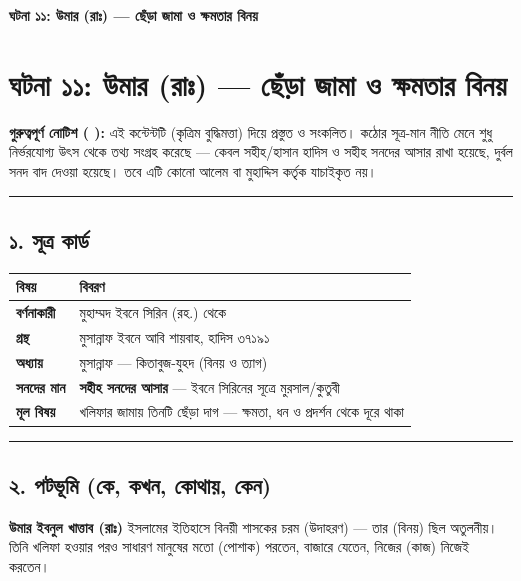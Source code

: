 

\begin{center}{\Large\bfseries\color{emerald} ঘটনা ১১: উমার (রাঃ) — ছেঁড়া জামা ও ক্ষমতার বিনয়}\end{center}
\vspace{1em}
\section*{ঘটনা ১১: উমার (রাঃ) — ছেঁড়া জামা ও ক্ষমতার বিনয়}

\begin{warnbox}
 \textbf{গুরুত্বপূর্ণ নোটিশ ( ):} এই কন্টেন্টটি  (কৃত্রিম বুদ্ধিমত্তা) দিয়ে প্রস্তুত ও সংকলিত।  কঠোর সূত্র-মান নীতি মেনে শুধু নির্ভরযোগ্য উৎস থেকে তথ্য সংগ্রহ করেছে — কেবল সহীহ/হাসান হাদিস ও সহীহ সনদের আসার রাখা হয়েছে, দুর্বল সনদ বাদ দেওয়া হয়েছে। তবে এটি কোনো আলেম বা মুহাদ্দিস কর্তৃক যাচাইকৃত নয়।
\end{warnbox}


\medskip\hrule\medskip

\subsection*{১. সূত্র কার্ড}

\begin{table}[h]\centering\small
\begin{tabular}{ll}
বিষয় & বিবরণ \\
\hline
\textbf{বর্ণনাকারী} & মুহাম্মদ ইবনে সিরিন (রহ.) থেকে \\
\textbf{গ্রন্থ} & মুসান্নাফ ইবনে আবি শায়বাহ, হাদিস ৩৭১৯১ \\
\textbf{অধ্যায়} & মুসান্নাফ — কিতাবুজ-যুহদ (বিনয় ও ত্যাগ) \\
\textbf{সনদের মান} & \textbf{সহীহ সনদের আসার} — ইবনে সিরিনের সূত্রে মুরসাল/কুতুবী \\
\textbf{মূল বিষয়} & খলিফার জামায় তিনটি ছেঁড়া দাগ — ক্ষমতা, ধন ও প্রদর্শন থেকে দূরে থাকা \\
\hline
\end{tabular}
\end{table}

\medskip\hrule\medskip

\subsection*{২. পটভূমি (কে, কখন, কোথায়, কেন)}

\textbf{উমার ইবনুল খাত্তাব (রাঃ)} ইসলামের ইতিহাসে বিনয়ী শাসকের চরম  (উদাহরণ) — তার  (বিনয়) ছিল অতুলনীয়। তিনি খলিফা হওয়ার পরও সাধারণ মানুষের মতো  (পোশাক) পরতেন, বাজারে যেতেন, নিজের  (কাজ) নিজেই করতেন।

